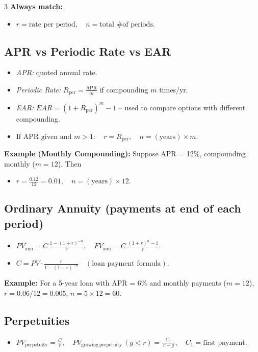 \documentclass[10pt,landscape,fleqn]{article}
\begin{document}
\begin{multicols}{3}
\textbf{Always match:} 
\begin{itemize}
  \item $r = \text{rate per period}, \quad n = \text{total \# of periods}.$
\end{itemize}

\subsection*{APR vs Periodic Rate vs EAR}
\begin{itemize}
  \item \emph{APR:} quoted annual rate. 
  \item \emph{Periodic Rate:} $R_{\mathrm{per}} = \tfrac{\mathrm{APR}}{m}$ if compounding $m$ times/yr. 
  \item \emph{EAR:} $EAR = (1 + R_{\mathrm{per}})^m - 1$ – used to compare options with different compounding.
\end{itemize}
\begin{itemize}
  \item $\text{If APR given and }m>1:\quad r = R_{\mathrm{per}},\quad n = (\text{years}) \times m.$
\end{itemize}
\textbf{Example (Monthly Compounding):} Suppose APR = 12\%, compounding monthly ($m = 12$). Then
\begin{itemize}
  \item $r = \frac{0.12}{12} = 0.01, \quad n = (\text{years}) \times 12.$
\end{itemize}

\subsection*{Ordinary Annuity (payments at end of each period)}
\begin{itemize}
  \item $PV_{\mathrm{ann}} = C\,\frac{1 - (1+r)^{-n}}{r}, \quad FV_{\mathrm{ann}} = C\,\frac{(1+r)^{n} - 1}{r}.$
  \item $C = PV \cdot \frac{r}{1 - (1+r)^{-n}} \quad (\text{loan payment formula}).$
\end{itemize}
\textbf{Example:} For a 5-year loan with APR = 6\% and monthly payments ($m=12$), $r = 0.06/12 = 0.005$, $n = 5\times12 = 60$.

\subsection*{Perpetuities}
\begin{itemize}
  \item $PV_{\mathrm{perpetuity}} = \frac{C}{r}, \quad PV_{\mathrm{growing\,perpetuity}}\,(g<r) = \frac{C_1}{\,r - g\,}, \quad C_1=\text{first payment}.$
\end{itemize}


\end{multicols}
\end{document}
